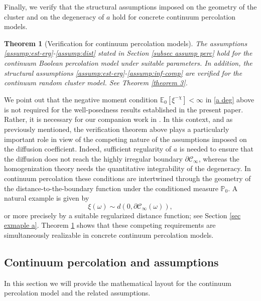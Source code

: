 \documentclass[11pt]{article}
\newcommand{\E}{\mathbb E}
\renewcommand{\P}{\mathbb P}
\newtheorem{theorem}{Theorem}[section]
\theoremstyle{rem}
\begin{document}
Finally, we verify that the structural assumptions imposed on the geometry of the cluster and on the degeneracy of $a$ hold for concrete continuum percolation models.

\begin{theorem}[Verification for continuum percolation models]\label{theorem 3'}
The assumptions \ref{assump:est-erg}-\ref{assump:dist} stated in Section \ref{subsec assump perc} hold for the continuum Boolean percolation model under suitable parameters. In addition, the structural assumptions \ref{assump:est-erg}-\ref{assump:inf-comp} are verified for the continuum random cluster model. See Theorem \ref{theorem 3}.
\end{theorem}

We point out that the negative moment condition $\E_0[\xi^{-\chi}]<\infty$ in \eqref{a deg} above is not required for the well-posedness results established in the present paper. Rather, it is necessary for our companion work in \cite{BMM26}. In this context, and as previously mentioned, the verification theorem above plays a particularly important role in view of the competing nature of the assumptions imposed on the diffusion coefficient. Indeed, sufficient regularity of $a$ is needed to ensure that the diffusion does not reach the highly irregular boundary $\partial\mathcal C_\infty$, whereas the homogenization theory needs the quantitative integrability of the degeneracy. In continuum percolation these conditions are intertwined through the geometry of the distance-to-the-boundary function under the conditioned measure $\P_0$. A natural example is given by
\[
\xi(\omega)\sim d(0,\partial\mathcal C_\infty(\omega)),
\]
or more precisely by a suitable regularized distance function; see Section \ref{sec exmaple a}. Theorem \ref{theorem 3'} shows that these competing requirements are simultaneously realizable in concrete continuum percolation models.





\subsection{Continuum percolation and assumptions}\label{sec-assume-models}
In this section we will provide the mathematical layout for the continuum percolation model and the related assumptions.  
\end{document}
